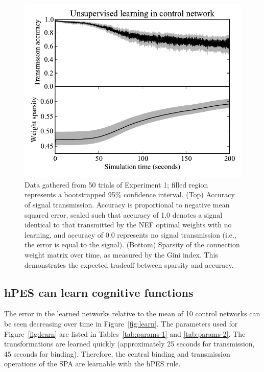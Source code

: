 \documentclass[10pt,letterpaper]{article}
\begin{document}
\begin{figure}[ht]
\begin{center}
\includegraphics[width=\columnwidth]{fig3-bcm}
\end{center}
\caption{Data gathered from 50 trials of Experiment 1;
  filled region represents a bootstrapped 95\% confidence interval.
  (Top) Accuracy of signal transmission.
  Accuracy is proportional to negative mean squared error,
  scaled such that accuracy of 1.0
  denotes a signal identical to that transmitted by the
  NEF optimal weights with no learning, and
  accuracy of 0.0 represents no signal transmission
  (i.e., the error is equal to the signal).
  (Bottom) Sparsity of the connection weight matrix over time,
  as measured by the Gini index. This demonstrates
  the expected tradeoff between sparsity and accuracy.}
\label{fig:bcm}
\end{figure}

\subsection{hPES can learn cognitive functions}

The error in the learned networks
relative to the mean of 10 control networks
can be seen decreasing over time in Figure~\ref{fig:learn}.
The parameters used for Figure~\ref{fig:learn}
are listed in Tables~\ref{tab:params-1} and \ref{tab:params-2}.
The transformations are learned quickly
(approximately 25 seconds for transmission, 45 seconds for binding).
Therefore, the central binding and transmission
operations of the SPA
are learnable with the hPES rule.
\end{document}
